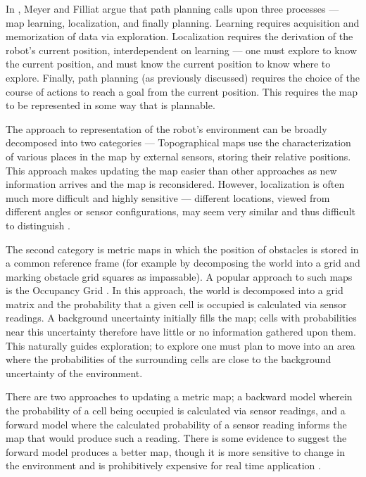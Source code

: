 \documentclass[authoryearcitations]{UoYCSproject}
\begin{document}
In  \cite{meyer}, Meyer and Filliat argue that path planning calls upon three processes --- map learning, localization, and finally planning. Learning requires acquisition and memorization of data via exploration. Localization requires the derivation of the robot's current position, interdependent on learning --- one must explore to know the current position, and must know the current position to know where to explore. Finally, path planning (as previously discussed) requires the choice of the course of actions to reach a goal from the current position. This requires the map to be represented in some way that is plannable.

The approach to representation of the robot's environment can be broadly decomposed into two categories --- Topographical maps use the characterization of various places in the map by external sensors, storing their relative positions. This approach makes updating the map easier than other approaches as new information arrives and the map is reconsidered. However, localization is often much more difficult and highly sensitive --- different locations, viewed from different angles or sensor configurations, may seem very similar and thus difficult to distinguish \cite{meyer}.

The second category is metric maps in which the position of obstacles is stored in a common reference frame (for example by decomposing the world into a grid and marking obstacle grid squares as impassable). A popular approach to such maps is the Occupancy Grid \cite{elfes}. In this approach, the world is decomposed into a grid matrix and the probability that a given cell is occupied is calculated via sensor readings. A background uncertainty initially fills the map; cells with probabilities near this uncertainty therefore have little or no information gathered upon them. This naturally guides exploration; to explore one must plan to move into an area where the probabilities of the surrounding cells are close to the background uncertainty of the environment.

There are two approaches to updating a metric map; a backward model wherein the probability of a cell being occupied is calculated via sensor readings, and a forward model where the calculated probability of a sensor reading informs the map that would produce such a reading. There is some evidence to suggest the forward model produces a better map, though it is more sensitive to change in the environment and is prohibitively expensive for real time application \cite{thrun}.
\end{document}
